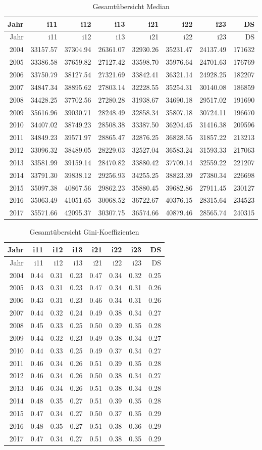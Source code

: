 \documentclass[ngerman,]{article}
\begin{document}
\begin{longtable}[]{@{}rrrrrrrr@{}}
\caption{Gesamtübersicht Median}\tabularnewline
\toprule
Jahr & i11 & i12 & i13 & i21 & i22 & i23 & DS\tabularnewline
\midrule
\endfirsthead
\toprule
Jahr & i11 & i12 & i13 & i21 & i22 & i23 & DS\tabularnewline
\midrule
\endhead
2004 & 33157.57 & 37304.94 & 26361.07 & 32930.26 & 35231.47 & 24137.49 &
171632\tabularnewline
2005 & 33386.58 & 37659.82 & 27127.42 & 33598.70 & 35976.64 & 24701.63 &
176769\tabularnewline
2006 & 33750.79 & 38127.54 & 27321.69 & 33842.41 & 36321.14 & 24928.25 &
182207\tabularnewline
2007 & 34847.34 & 38895.62 & 27803.14 & 32228.55 & 35254.31 & 30140.08 &
186859\tabularnewline
2008 & 34428.25 & 37702.56 & 27280.28 & 31938.67 & 34690.18 & 29517.02 &
191690\tabularnewline
2009 & 35616.96 & 39030.71 & 28248.49 & 32858.34 & 35807.18 & 30724.11 &
196670\tabularnewline
2010 & 34407.02 & 38749.23 & 28508.38 & 33387.50 & 36204.45 & 31416.38 &
209596\tabularnewline
2011 & 34849.23 & 39571.97 & 28865.47 & 32876.25 & 36828.55 & 31857.22 &
213213\tabularnewline
2012 & 33096.32 & 38489.05 & 28229.03 & 32527.04 & 36583.24 & 31593.33 &
217063\tabularnewline
2013 & 33581.99 & 39159.14 & 28470.82 & 33880.42 & 37709.14 & 32559.22 &
221207\tabularnewline
2014 & 33791.30 & 39838.12 & 29256.93 & 34255.25 & 38823.39 & 27380.34 &
226698\tabularnewline
2015 & 35097.38 & 40867.56 & 29862.23 & 35880.45 & 39682.86 & 27911.45 &
230127\tabularnewline
2016 & 35063.49 & 41051.65 & 30068.52 & 36722.67 & 40376.15 & 28315.64 &
234523\tabularnewline
2017 & 35571.66 & 42095.37 & 30307.75 & 36574.66 & 40879.46 & 28565.74 &
240315\tabularnewline
\bottomrule
\end{longtable}

\begin{longtable}[]{@{}rrrrrrrr@{}}
\caption{Gesamtübersicht Gini-Koeffizienten}\tabularnewline
\toprule
Jahr & i11 & i12 & i13 & i21 & i22 & i23 & DS\tabularnewline
\midrule
\endfirsthead
\toprule
Jahr & i11 & i12 & i13 & i21 & i22 & i23 & DS\tabularnewline
\midrule
\endhead
2004 & 0.44 & 0.31 & 0.23 & 0.47 & 0.34 & 0.32 & 0.25\tabularnewline
2005 & 0.43 & 0.31 & 0.23 & 0.47 & 0.34 & 0.31 & 0.26\tabularnewline
2006 & 0.43 & 0.31 & 0.23 & 0.46 & 0.34 & 0.31 & 0.26\tabularnewline
2007 & 0.44 & 0.32 & 0.24 & 0.49 & 0.38 & 0.34 & 0.27\tabularnewline
2008 & 0.45 & 0.33 & 0.25 & 0.50 & 0.39 & 0.35 & 0.28\tabularnewline
2009 & 0.44 & 0.32 & 0.23 & 0.49 & 0.38 & 0.34 & 0.27\tabularnewline
2010 & 0.44 & 0.33 & 0.25 & 0.49 & 0.37 & 0.34 & 0.27\tabularnewline
2011 & 0.46 & 0.34 & 0.26 & 0.51 & 0.39 & 0.35 & 0.28\tabularnewline
2012 & 0.46 & 0.34 & 0.26 & 0.50 & 0.38 & 0.34 & 0.27\tabularnewline
2013 & 0.46 & 0.34 & 0.26 & 0.51 & 0.38 & 0.34 & 0.28\tabularnewline
2014 & 0.48 & 0.35 & 0.27 & 0.51 & 0.39 & 0.35 & 0.28\tabularnewline
2015 & 0.47 & 0.34 & 0.27 & 0.50 & 0.37 & 0.35 & 0.29\tabularnewline
2016 & 0.48 & 0.35 & 0.27 & 0.51 & 0.38 & 0.36 & 0.29\tabularnewline
2017 & 0.47 & 0.34 & 0.27 & 0.51 & 0.38 & 0.35 & 0.29\tabularnewline
\bottomrule
\end{longtable}
\end{document}
